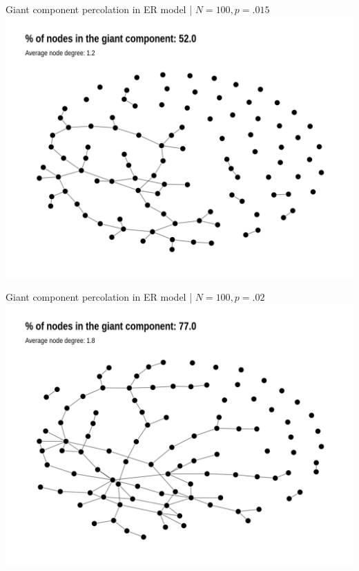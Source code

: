 \documentclass[
    hyperref={colorlinks,linkcolor=blue,urlcolor=blue,citecolor=blue}
]{beamer}
\begin{document}
\begin{frame}{Giant component percolation in ER model | $N = 100, p = .015$}
\centering
\includegraphics[width=.9\textwidth]{overview/er_model_percolation-3.png}
\end{frame}

\begin{frame}{Giant component percolation in ER model | $N = 100, p = .02$}
\centering
\includegraphics[width=.9\textwidth]{overview/er_model_percolation-4.png}
\end{frame}
\end{document}

